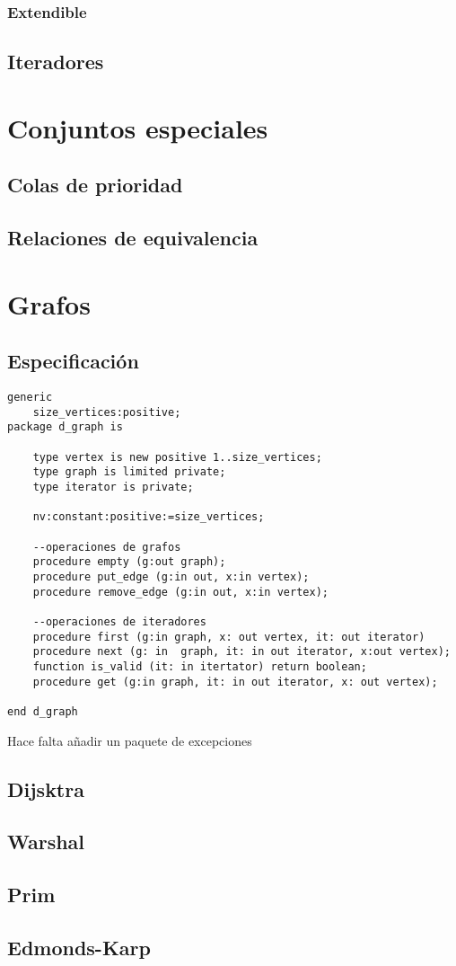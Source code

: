 \documentclass[a4paper,10pt]{book}
\begin{document}
\subsection{Extendible}

\section{Iteradores}

\chapter{Conjuntos especiales}


\section{Colas de prioridad}

\section{Relaciones de equivalencia}

\chapter{Grafos}

\section{Especificación}
\begin{lstlisting}
generic
	size_vertices:positive;
package d_graph is
	
	type vertex is new positive 1..size_vertices;
	type graph is limited private;
	type iterator is private;
	
	nv:constant:positive:=size_vertices;

	--operaciones de grafos
	procedure empty (g:out graph);
	procedure put_edge (g:in out, x:in vertex);
	procedure remove_edge (g:in out, x:in vertex);

	--operaciones de iteradores
	procedure first (g:in graph, x: out vertex, it: out iterator)
	procedure next (g: in  graph, it: in out iterator, x:out vertex);
	function is_valid (it: in itertator) return boolean;
	procedure get (g:in graph, it: in out iterator, x: out vertex);

end d_graph
\end{lstlisting}

Hace falta añadir un paquete de excepciones

\section{Dijsktra}

\section{Warshal}

\section{Prim}

\section{Edmonds-Karp}
\end{document}
